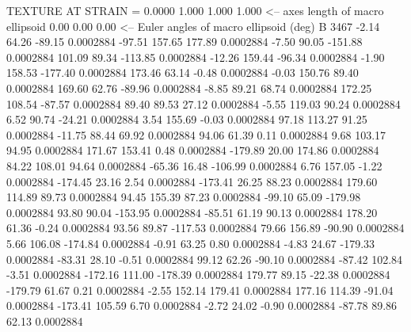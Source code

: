 TEXTURE AT STRAIN =    0.0000
   1.000   1.000   1.000  <-- axes length of macro ellipsoid
    0.00    0.00    0.00  <-- Euler angles of macro ellipsoid (deg)
B      3467
       -2.14       64.26      -89.15     0.0002884
      -97.51      157.65      177.89     0.0002884
       -7.50       90.05     -151.88     0.0002884
      101.09       89.34     -113.85     0.0002884
      -12.26      159.44      -96.34     0.0002884
       -1.90      158.53     -177.40     0.0002884
      173.46       63.14       -0.48     0.0002884
       -0.03      150.76       89.40     0.0002884
      169.60       62.76      -89.96     0.0002884
       -8.85       89.21       68.74     0.0002884
      172.25      108.54      -87.57     0.0002884
       89.40       89.53       27.12     0.0002884
       -5.55      119.03       90.24     0.0002884
        6.52       90.74      -24.21     0.0002884
        3.54      155.69       -0.03     0.0002884
       97.18      113.27       91.25     0.0002884
      -11.75       88.44       69.92     0.0002884
       94.06       61.39        0.11     0.0002884
        9.68      103.17       94.95     0.0002884
      171.67      153.41        0.48     0.0002884
     -179.89       20.00      174.86     0.0002884
       84.22      108.01       94.64     0.0002884
      -65.36       16.48     -106.99     0.0002884
        6.76      157.05       -1.22     0.0002884
     -174.45       23.16        2.54     0.0002884
     -173.41       26.25       88.23     0.0002884
      179.60      114.89       89.73     0.0002884
       94.45      155.39       87.23     0.0002884
      -99.10       65.09     -179.98     0.0002884
       93.80       90.04     -153.95     0.0002884
      -85.51       61.19       90.13     0.0002884
      178.20       61.36       -0.24     0.0002884
       93.56       89.87     -117.53     0.0002884
       79.66      156.89      -90.90     0.0002884
        5.66      106.08     -174.84     0.0002884
       -0.91       63.25        0.80     0.0002884
       -4.83       24.67     -179.33     0.0002884
      -83.31       28.10       -0.51     0.0002884
       99.12       62.26      -90.10     0.0002884
      -87.42      102.84       -3.51     0.0002884
     -172.16      111.00     -178.39     0.0002884
      179.77       89.15      -22.38     0.0002884
     -179.79       61.67        0.21     0.0002884
       -2.55      152.14      179.41     0.0002884
      177.16      114.39      -91.04     0.0002884
     -173.41      105.59        6.70     0.0002884
       -2.72       24.02       -0.90     0.0002884
      -87.78       89.86       62.13     0.0002884
